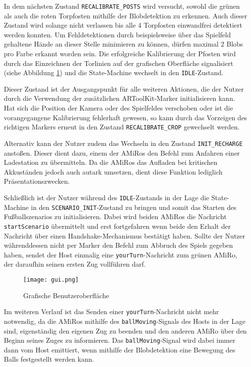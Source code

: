 In dem nächsten Zustand \texttt{RECALIBRATE\_POSTS} wird versucht, sowohl die grünen als auch die roten Torpfosten mithilfe der Blobdetektion zu erkennen. Auch dieser Zustand wird solange nicht verlassen bis alle 4 Torpfosten einwandfrei detektiert werden konnten. Um Fehldetektionen durch beispielsweise über das Spielfeld gehaltene Hände an dieser Stelle minimieren zu können, dürfen maximal 2 Blobs pro Farbe erkannt worden sein. Die erfolgreiche Kalibrierung der Pfosten wird durch das Einzeichnen der Torlinien auf der grafischen Oberfläche signalisiert (siehe Abbildung \ref{fig:gui}) und die State-Machine wechselt in den \texttt{IDLE}-Zustand.

Dieser Zustand ist der Ausgangspunkt für alle weiteren Aktionen, die der Nutzer durch die Verwendung der zusätzlichen ARToolKit-Marker initialisieren kann. Hat sich die Position der Kamera oder des Spielfeldes verschoben oder ist die vorangegangene Kalibrierung fehlerhaft gewesen, so kann durch das Vorzeigen des richtigen Markers erneut in den Zustand \texttt{RECALIBRATE\_CROP} gewechselt werden.

Alternativ kann der Nutzer zudem das Wechseln in den Zustand \texttt{INIT\_RECHARGE} anstoßen. Dieser dient dazu, einem der AMiRos den Befehl zum Anfahren einer Ladestation zu übermitteln. Da die AMiRos das Aufladen bei kritischen Akkuständen jedoch auch autark umsetzen, dient diese Funktion lediglich Präsentationszwecken.

Schließlich ist der Nutzer während des \texttt{IDLE}-Zustands in der Lage die State-Machine in den \texttt{SCENARIO\_INIT}-Zustand zu bringen und somit das Starten des Fußballszenarios zu initialisieren. Dabei wird beiden AMiRos die Nachricht \texttt{startScenario} übermittelt und erst fortgefahren wenn beide den Erhalt der Nachricht über einen Handshake-Mechanismus bestätigt haben. Sollte der Nutzer währenddessen nicht per Marker den Befehl zum Abbruch des Spiels gegeben haben, sendet der Host einmalig eine \texttt{yourTurn}-Nachricht zum grünen AMiRo, der daraufhin seinen ersten Zug vollführen darf.

\begin{figure}[t]
	\begin{center}
		\texttt{[image: gui.png]} 	
		\caption{Grafische Benutzeroberfläche}
		\label{fig:gui}
	\end{center}
\end{figure}

Im weiteren Verlauf ist das Senden einer \texttt{yourTurn}-Nachricht nicht mehr notwendig, da die AMiRos mithilfe des \texttt{ballMoving}-Signals des Hosts in der Lage sind, eigenständig den eigenen Zug zu beenden und den anderen AMiRo über den Beginn seines Zuges zu informieren. Das \texttt{ballMoving}-Signal wird dabei immer dann vom Host emittiert, wenn mithilfe der Blobdetektion eine Bewegung des Balls festgestellt werden kann.

